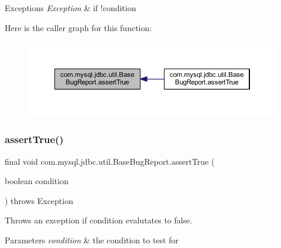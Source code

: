 \begin{DoxyExceptions}{Exceptions}
{\em Exception} & if !condition \\
\hline
\end{DoxyExceptions}
Here is the caller graph for this function\+:
\nopagebreak
\begin{figure}[H]
\begin{center}
\leavevmode
\includegraphics[width=350pt]{classcom_1_1mysql_1_1jdbc_1_1util_1_1_base_bug_report_a5b56a6069b17d432a189c5185ec897c7_icgraph}
\end{center}
\end{figure}
\mbox{\label{classcom_1_1mysql_1_1jdbc_1_1util_1_1_base_bug_report_a8b90786036a7a973ea14429854aa3f65}} 
\subsubsection{\texorpdfstring{assert\+True()}{assertTrue()}\hspace{0.1cm}{\footnotesize\ttfamily [2/2]}}
{\footnotesize\ttfamily final void com.\+mysql.\+jdbc.\+util.\+Base\+Bug\+Report.\+assert\+True (\begin{DoxyParamCaption}\item[{boolean}]{condition }\end{DoxyParamCaption}) throws Exception\hspace{0.3cm}{\ttfamily [protected]}}

Throws an exception if condition evalutates to \textquotesingle{}false\textquotesingle{}.


\begin{DoxyParams}{Parameters}
{\em condition} & the condition to test for \\
\hline
\end{DoxyParams}

